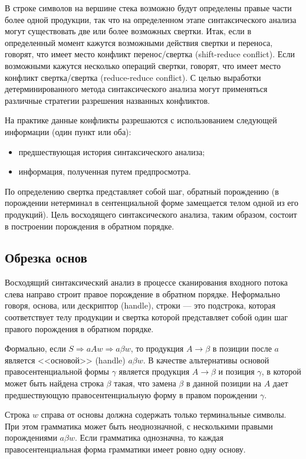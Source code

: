 \documentclass[bachelor, och, coursework, times]{SCWorks}
\begin{document}
В строке символов на вершине стека возможно будут определены правые части более одной продукции, так что на определенном этапе синтаксического анализа могут существовать две или более возможных свертки. Итак, если в определенный момент кажутся возможными действия свертки и переноса, говорят, что имеет место конфликт перенос/свертка (shift-reduce conflict). Если возможными кажутся несколько операций свертки, говорят, что имеет место конфликт свертка/свертка (reduce-reduce conflict). С целью выработки детерминированного метода синтаксического анализа могут применяться различные стратегии разрешения названных конфликтов.~\cite{myshared}

На практике данные конфликты разрешаются с использованием следующей информации (один пункт или оба):
\begin{itemize}
	\item предшествующая история синтаксического анализа;
	\item информация, полученная путем предпросмотра.
\end{itemize}

По определению свертка представляет собой шаг, обратный порождению  
(в порождении нетерминал в сентенциальной форме замещается телом 
одной из его продукций). Цель восходящего синтаксического анализа, таким  
образом, состоит в построении порождения в обратном порядке.~\cite{Kluch}

\subsection{Обрезка основ}

Восходящий синтаксический анализ в процессе сканирования входного  
потока слева направо строит правое порождение в обратном порядке. Неформально 
говоря, основа, или дескриптор (handle), строки — это подстрока, которая  
соответствует телу продукции и свертка которой представляет собой один шаг правого 
порождения в обратном порядке. 

Формально, если $S \Rightarrow aAw \Rightarrow a\beta w$, то продукция $A \to \beta$ в позиции после $a$ является <<основой>> (handle) $a\beta w$. В качестве альтернативы основой правосентенциальной формы $\gamma$ является продукция $A \to \beta$ и позиция $\gamma$, в которой может быть найдена строка $\beta$ такая, что замена $\beta$ в данной позиции на $A$ дает предшествующую правосентенциальную форму в правом порождении $\gamma$.~\cite{Compilers}

Строка $w$ справа от основы должна содержать только терминальные символы. При этом грамматика может быть неоднозначной, с несколькими правыми порождениями $a\beta w$. Если грамматика однозначна, то каждая правосентенциальная форма грамматики имеет ровно одну основу. 
\end{document}
